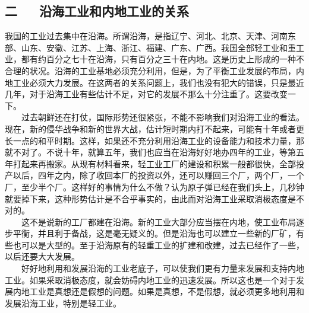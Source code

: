 \documentclass[cn,11pt,chinese]{elegantbook}
\def\myformat#1{\hfil\hfil #1}
\begin{document}
\subsection*{\myformat{二 　  沿海工业和内地工业的关系}}
我国的工业过去集中在沿海。所谓沿海，是指辽宁、河北、北京、天津、河南东部、山东、安徽、江苏、上海、浙江、福建、广东、广西。我国全部轻工业和重工业，都有约百分之七十在沿海，只有百分之三十在内地。这是历史上形成的一种不合理的状况。沿海的工业基地必须充分利用，但是，为了平衡工业发展的布局，内地工业必须大力发展。在这两者的关系问题上，我们也没有犯大的错误，只是最近几年，对于沿海工业有些估计不足，对它的发展不那么十分注重了。这要改变一下。\\
　　过去朝鲜还在打仗，国际形势还很紧张，不能不影响我们对沿海工业的看法。现在，新的侵华战争和新的世界大战，估计短时期内打不起来，可能有十年或者更长一点的和平时期。这样，如果还不充分利用沿海工业的设备能力和技术力量，那就不对了。不说十年，就算五年，我们也应当在沿海好好地办四年的工业，等第五年打起来再搬家。从现有材料看来，轻工业工厂的建设和积累一般都很快，全部投产以后，四年之内，除了收回本厂的投资以外，还可以赚回三个厂，两个厂，一个厂，至少半个厂。这样好的事情为什么不做？认为原子弹已经在我们头上，几秒钟就要掉下来，这种形势估计是不合乎事实的，由此而对沿海工业采取消极态度是不对的。\\
　　这不是说新的工厂都建在沿海。新的工业大部分应当摆在内地，使工业布局逐步平衡，并且利于备战，这是毫无疑义的。但是沿海也可以建立一些新的厂矿，有些也可以是大型的。至于沿海原有的轻重工业的扩建和改建，过去已经作了一些，以后还要大大发展。\\
　　好好地利用和发展沿海的工业老底子，可以使我们更有力量来发展和支持内地工业。如果采取消极态度，就会妨碍内地工业的迅速发展。所以这也是一个对于发展内地工业是真想还是假想的问题。如果是真想，不是假想，就必须更多地利用和发展沿海工业，特别是轻工业。\\
\end{document}

